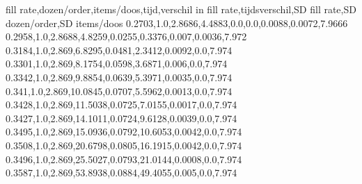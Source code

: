 fill rate,dozen/order,items/doos,tijd,verschil in fill rate,tijdsverschil,SD fill rate,SD dozen/order,SD items/doos
0.2703,1.0,2.8686,4.4883,0.0,0.0,0.0088,0.0072,7.9666
0.2958,1.0,2.8688,4.8259,0.0255,0.3376,0.007,0.0036,7.972
0.3184,1.0,2.869,6.8295,0.0481,2.3412,0.0092,0.0,7.974
0.3301,1.0,2.869,8.1754,0.0598,3.6871,0.006,0.0,7.974
0.3342,1.0,2.869,9.8854,0.0639,5.3971,0.0035,0.0,7.974
0.341,1.0,2.869,10.0845,0.0707,5.5962,0.0013,0.0,7.974
0.3428,1.0,2.869,11.5038,0.0725,7.0155,0.0017,0.0,7.974
0.3427,1.0,2.869,14.1011,0.0724,9.6128,0.0039,0.0,7.974
0.3495,1.0,2.869,15.0936,0.0792,10.6053,0.0042,0.0,7.974
0.3508,1.0,2.869,20.6798,0.0805,16.1915,0.0042,0.0,7.974
0.3496,1.0,2.869,25.5027,0.0793,21.0144,0.0008,0.0,7.974
0.3587,1.0,2.869,53.8938,0.0884,49.4055,0.005,0.0,7.974
